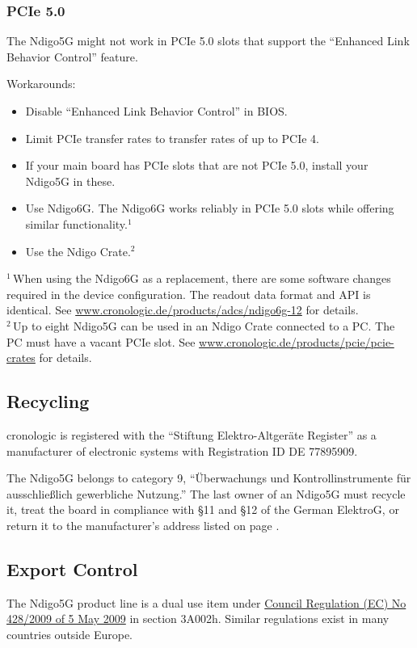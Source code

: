 \subsubsection{PCIe 5.0}
The Ndigo5G might not work in PCIe 5.0 slots that support the ``Enhanced Link Behavior Control'' feature.\par
Workarounds:
\begin{itemize}
    \item Disable ``Enhanced Link Behavior Control'' in BIOS.
    \item Limit PCIe transfer rates to transfer rates of up to PCIe 4.
    \item If your main board has PCIe slots that are not PCIe 5.0, install your Ndigo5G in these.
    \item Use Ndigo6G. The Ndigo6G works reliably in PCIe 5.0 slots while offering similar functionality.$^1$
    \item Use the Ndigo Crate.$^2$
\end{itemize}
{\small $^1$\,When using the Ndigo6G as a replacement, there are some software changes required in the device configuration. The readout data format and API is identical. See \href{https://www.cronologic.de/products/adcs/ndigo6g-12}{www.cronologic.de/products/adcs/ndigo6g-12} for details.}\\
{\small $^2$\,Up to eight Ndigo5G can be used in an Ndigo Crate connected to a PC. The PC must have a vacant PCIe slot. See \href{https://www.cronologic.de/products/pcie/pcie-crates}{www.cronologic.de/products/pcie/pcie-crates} for details.}


\subsection{Recycling}

    cronologic is registered with the ``Stiftung Elektro-Altgeräte Register'' as a manufacturer of electronic systems with Registration ID DE 77895909.\par

    The Ndigo5G belongs to category 9, ``Überwachungs und Kontrollinstrumente f\"u{}r aus\-schlie\ss lich gewerbliche Nutzung.'' The last owner of an Ndigo5G must recycle it, treat the board in compliance with \S{}11 and \S{}12 of the German ElektroG, or return it to the manufacturer's address listed on page \pageref{cp:manu}.

\subsection{Export Control}
The Ndigo5G product line is a dual use item under \href{https://eur-lex.europa.eu/eli/reg/2009/428/oj}{Council Regulation (EC) No 428/2009 of 5 May 2009} in section 3A002h. Similar regulations exist in many countries outside Europe.

